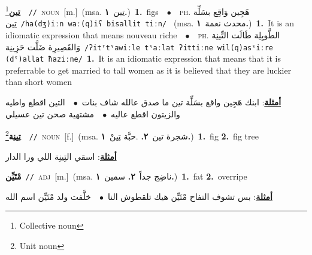 \documentclass[10pt,a4paper,twoside]{article} %
\begin{document}
\begin{multicols}{2}
{\setlength\topsep{0pt}\textbf{\foreignlanguage{arabic}{تِين}}\footnote{Collective noun}\ \ {\color{gray}\texttt{//}\color{black}}\ \textsc{noun}\ [m.]\ \color{gray}(msa. \foreignlanguage{arabic}{تِين}~\foreignlanguage{arabic}{\textbf{١.}})\color{black}\ \textbf{1.}~figs\ \ $\bullet$\ \ \textsc{ph.} \color{gray} \foreignlanguage{arabic}{هَجِين وَاقِع بسَلِّة تِين}\color{black}\ {\color{gray}\texttt{/{\sffamily ha(dʒ)iːn waː(q)iʕ bisallit tiːn}/}\color{black}}\ \color{gray} (msa. \foreignlanguage{arabic}{محدث نعمة}~\foreignlanguage{arabic}{\textbf{١.}})\color{black}\ \textbf{1.}~It is an idiomatic expression that means nouveau riche\ \ $\bullet$\ \ \textsc{ph.} \color{gray} \foreignlanguage{arabic}{الطَّويِلِة طَالَت التِّينِة وَالقَصِيرِة ضَلَّت حَزِينِة}\color{black}\ {\color{gray}\texttt{/{\sffamily ʔitˤtˤawiːle tˤaːlat ʔittiːne wil(q)asˤiːre (dˤ)allat ħaziːne}/}\color{black}}\ \textbf{1.}~It is an idiomatic expression that means that it is preferrable to get married to tall women as it is believed that they are luckier than short women\  \begin{flushright}\color{gray}\foreignlanguage{arabic}{\textbf{\underline{\foreignlanguage{arabic}{أمثلة}}}: ابنك هَجِين واقع بسَلِّة تين ما صدق عالله شاف بنات\ $\bullet$\ \  التين اقطع واطيه والزيتون اقطع عاليه\ $\bullet$\ \  مشتهية صحن تين عسيلي}\end{flushright}\color{black}} \vspace{2mm}

{\setlength\topsep{0pt}\textbf{\foreignlanguage{arabic}{تِينِة}}\footnote{Unit noun}\ \ {\color{gray}\texttt{//}\color{black}}\ \textsc{noun}\ [f.]\ \color{gray}(msa. \foreignlanguage{arabic}{شجرة تين}~\foreignlanguage{arabic}{\textbf{٢.}}  .\foreignlanguage{arabic}{حبَّة تِينْ}~\foreignlanguage{arabic}{\textbf{١.}})\color{black}\ \textbf{1.}~fig  \textbf{2.}~fig tree\  \begin{flushright}\color{gray}\foreignlanguage{arabic}{\textbf{\underline{\foreignlanguage{arabic}{أمثلة}}}: اسقي التِينِة اللي ورا الدار}\end{flushright}\color{black}} \vspace{2mm}

{\setlength\topsep{0pt}\textbf{\foreignlanguage{arabic}{مْتَيِّن}}\ {\color{gray}\texttt{//}\color{black}}\ \textsc{adj}\ [m.]\ \color{gray}(msa. \foreignlanguage{arabic}{ناضِج جداً}~\foreignlanguage{arabic}{\textbf{٢.}}  \foreignlanguage{arabic}{سمين}~\foreignlanguage{arabic}{\textbf{١.}})\color{black}\ \textbf{1.}~fat  \textbf{2.}~overripe\  \begin{flushright}\color{gray}\foreignlanguage{arabic}{\textbf{\underline{\foreignlanguage{arabic}{أمثلة}}}: بس تشوف التفاح مْتَيِّن هيك تلقطوش النا\ $\bullet$\ \  خلَّفت ولد مْتَيِّن اسم الله}\end{flushright}\color{black}} \vspace{2mm}


\end{multicols}
\end{document}
